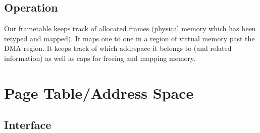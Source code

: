 \documentclass[12pt]{article}
\begin{document}
\subsection{Operation}
Our frametable keeps track of allocated frames (physical memory which has been retyped and mapped). It maps one to one in a region of virtual memory past the DMA region. It keeps track of which addrspace it belongs to (and related information) as well as caps for freeing and mapping memory.

\clearpage
\section{Page Table/Address Space}
\subsection{Interface}
\end{document}
